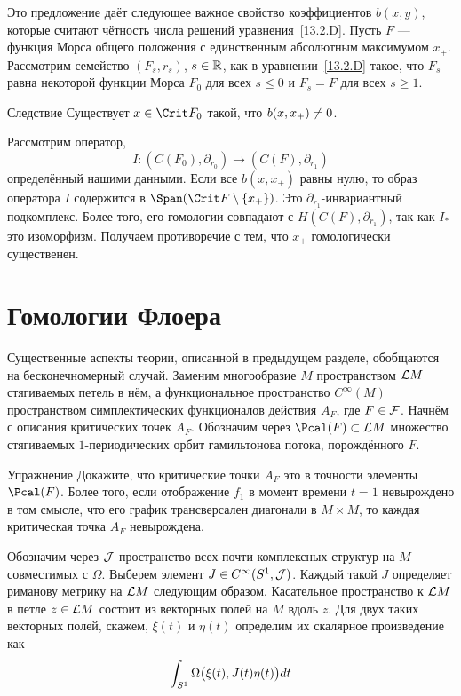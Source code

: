 Это предложение даёт следующее важное свойство коэффициентов $b(x,
y)$, которые считают чётность числа решений
уравнения~\ref{13.2.D}. 
Пусть $F$ — функция Морса общего положения с единственным абсолютным
максимумом $x_{+}$.
Рассмотрим семейство $(F_{s},r_{s})$, $s\in\mathbb{R}$, как в
уравнении~\ref{13.2.D} такое, что $F_{s}$ равна некоторой функции
Морса $F_{0}$ для всех $s\le0$ и $F_{s} = F$ для всех $s\ge1$.


\begin{thm}{Следствие}\label{13.2.H}
  Существует $x\in\Crit F_{0}$ такой, что $b(x, x_{+})\z\neq0$.  
\end{thm}

Рассмотрим оператор,
\[
I:(C(F_{0}),\partial_{r_{0}})\to (C(F),\partial_{r_{1}})
\]
определённый нашими данными.
Если все $b(x,x_{+})$ равны нулю, то образ оператора $I$ содержится в
$\Span(\Crit F\setminus\{x_{+}\})$. 
Это $\partial_{r_{1}}$-ин\-ва\-ри\-ант\-ный подкомплекс.
Более того, его гомологии совпадают с $H(C(F),\partial_{r_{1}})$,
так как $I_{*}$ это изоморфизм.
Получаем противоречие с тем, что $x_{+}$ гомологически существенен.
\qeds

\section{Гомологии Флоера}\label{13.3}
Существенные аспекты теории, описанной в предыдущем разделе,
обобщаются на бесконечномерный случай.
Заменим многообразие $M$ пространством $\mathcal{L} M$ стягиваемых петель в нём, а функциональное
пространство $C^{\infty}(M)$ пространством симплектических
функционалов действия $A_{F}$, где $F\in\mathcal{F}$.
Начнём с описания критических точек $A_{F}$.
Обозначим через $\Pcal(F)\subset\L M$ множество стягиваемых
$1$-периодических орбит гамильтонова потока, порождённого $F$.

\begin{ex}{Упражнение}\label{13.3.A}
Докажите, что критические точки $A_{F}$ это в точности элементы $\Pcal(F)$.
Более того, если отображение $f_{1}$ в момент времени $t=1$ невырождено в том смысле, что его график трансверсален диагонали в $M\times M$, то каждая критическая точка $A_{F}$ невырождена.
\end{ex}

Обозначим через $\mathcal{J}$ пространство всех почти комплексных структур
на $M$ совместимых с $\Omega$.
Выберем элемент $J\in C^{\infty}(S^{1},\mathcal{J})$.
Каждый такой $J$ определяет риманову метрику на $\mathcal{L} M$ следующим образом.
Касательное пространство к $\mathcal{L} M$ в петле $z\in\mathcal{L} M$
состоит из
векторных полей на $M$ вдоль $z$. 
Для двух таких векторных полей, скажем, $\xi(t)$ и $\eta(t)$ определим
их скалярное произведение как 
\[
\int_{S^{1}}\Omega\big(\xi(t),J(t)\eta(t)\big)d t
\]

